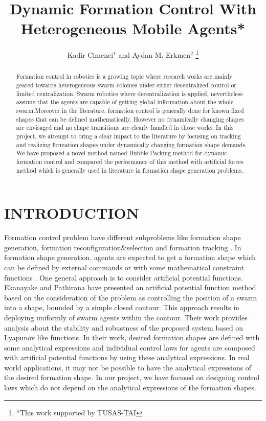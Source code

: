 \documentclass[letterpaper, 10 pt, conference]{ieeeconf}  %
\title{\LARGE \bf
Dynamic Formation Control With Heterogeneous Mobile Agents*
}
\author{Kadir Cimenci$^{1}$ and Aydan M. Erkmen$^{2}$%
\thanks{*This work supported by TUSAS-TAI}%
}
\begin{document}
\maketitle
\thispagestyle{empty}
\pagestyle{empty}


\begin{abstract}
Formation control in robotics is a growing topic where research works are mainly geared towards heterogeneous swarm colonies under either decentralized control or limited centralization. Swarm robotics where decentralization is applied, nevertheless assume that the agents are capable of getting global information about the whole swarm.Moreover in the literature, formation control is generally done for known fixed shapes that can be defined mathematically. However no dynamically changing shapes are envisaged and no shape transitions are clearly handled in those works. In this project, we attempt to bring a clear impact to the literature by focusing on tracking and realizing formation shapes under dynamically changing formation shape demands. We have proposed a novel method named Bubble Packing method for dynamic formation control and compared the performance of this method with artificial forces method which is generally used in literature in formation shape generation problems.
\end{abstract}


\section{INTRODUCTION}
Formation control problem have different subproblems like formation shape generation, formation reconfiguration$\&$selection and formation tracking \cite{12}.  
In formation shape generation, agents are expected to get a formation shape which can be defined by external commands or with some mathematical constraint functions \cite{16}.  One general approach is to consider artificial potential functions. Ekanayake and Pathirana \cite{17} have presented an artificial potential function method  based on the consideration of the problem as controlling the position of a swarm into a shape, bounded by a simple closed contour. This approach results in deploying uniformly of swarm agents within the contour.  Their work provides analysis about the stability and robustness of the proposed system based on Lyapunov like functions. In their work, desired formation shapes are defined with some analytical expressions and individual control laws for agents are composed with artificial potential functions by using these analytical expressions. In real world applications, it may not be possible to have the analytical expressions of the desired formation shape. In our project, we have focused on designing control laws which do not depend on the analytical expressions of the formation shapes.
\end{document}
